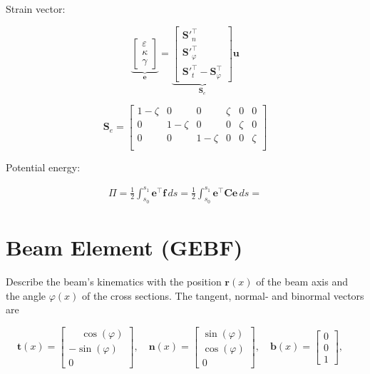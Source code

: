 Strain vector:

\begin{equation}
\underbrace{
\begin{bmatrix}
\varepsilon \\ \kappa \\ \gamma
\end{bmatrix}
}_{\boldsymbol{e}}
=
\underbrace{
\begin{bmatrix}
\boldsymbol{S}'^\intercal_n \\ \boldsymbol{S}'^\intercal_\varphi \\ \boldsymbol{S}'^\intercal_t - \boldsymbol{S}^\intercal_\varphi
\end{bmatrix}
}_{\boldsymbol{S}_e}
\boldsymbol{u}
\end{equation}

\begin{equation}
\boldsymbol{S}_e = \begin{bmatrix}
1-\zeta & 0 & 0 & \zeta & 0 & 0 \\
0 & 1-\zeta & 0 & 0 & \zeta & 0 \\
0 & 0 & 1-\zeta & 0 & 0 & \zeta \\
\end{bmatrix}
\end{equation}


Potential energy:

\begin{align}
\Pi = \frac{1}{2}\int_{s_0}^{s_1} \boldsymbol{e}^\intercal\boldsymbol{f}\,ds = \frac{1}{2}\int_{s_0}^{s_1} \boldsymbol{e}^\intercal\boldsymbol{C}\boldsymbol{e}\,ds = 
\end{align}



\newpage
\section{Beam Element (GEBF)}

Describe the beam's kinematics with the position $\boldsymbol{r}(x)$ of the beam axis and the angle $\varphi(x)$ of the cross sections.
The tangent, normal- and binormal vectors are

\begin{equation}
\boldsymbol{t}(x) = \begin{bmatrix}
\phantom{-}\cos(\varphi) \\ -\sin(\varphi) \\ 0
\end{bmatrix}, \quad
\boldsymbol{n}(x) = \begin{bmatrix}
\sin(\varphi) \\ \cos(\varphi) \\ 0
\end{bmatrix}, \quad
\boldsymbol{b}(x) = \begin{bmatrix}
0 \\ 0 \\ 1
\end{bmatrix}, \quad
\end{equation}

